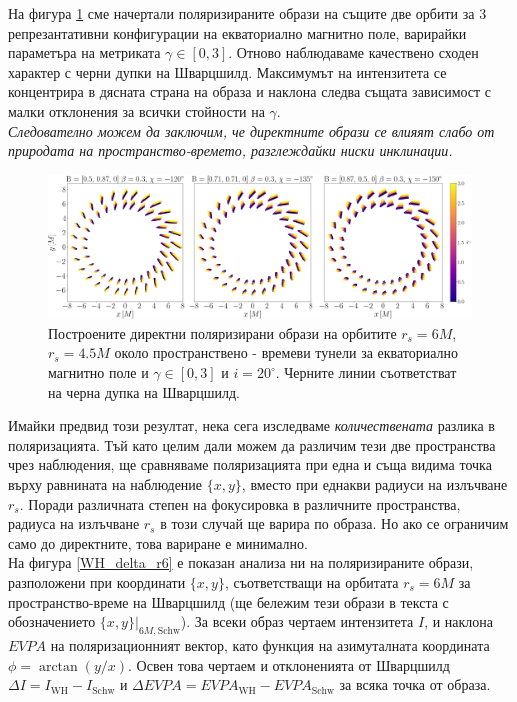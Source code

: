 На фигура \ref{WH_pol_eq_field} сме начертали поляризираните образи на същите две орбити за 3 репрезантативни конфигурации на екваториално магнитно поле, варирайки параметъра на метриката $\gamma \in[0,3]$. Отново наблюдаваме качествено сходен характер с черни дупки на Шварцшилд. Максимумът на интензитета се концентрира в дясната страна на образа и наклона следва същата зависимост с малки отклонения за всички стойности на $\gamma$. \\

\emph{Следователно можем да заключим, че директните образи се влияят слабо от природата на пространство-времето, разглеждайки ниски инклинации.}

\begin{figure}[!htb]
	\centering
	\includegraphics[scale = 0.2]{WH_alpha_Eq_Field.png}
	\caption[Поляризирани директни образи около пространствено - времеви тунели за екваториално магнитно поле.]{\small Построените директни поляризирани образи на орбитите $r_s = 6M$, $r_s = 4.5M$ около пространствено - времеви тунели за екваториално магнитно поле и $\gamma \in[0,3]$ и $i = 20^\circ$. Черните линии съответстват на черна дупка на Шварцшилд.} 
	\label{WH_pol_eq_field}
\end{figure}

\newpage

Имайки предвид този резултат, нека сега изследваме \emph{количествената} разлика в поляризацията. Тъй като целим дали можем да различим тези две пространства чрез наблюдения, ще сравняваме поляризацията при една и съща видима точка върху равнината на наблюдение $\{x,y\}$, вместо при еднакви радиуси на излъчване $r_s$. Поради различната степен на фокусировка в различните пространства, радиуса на излъчване $r_s$ в този случай ще варира по образа. Но ако се ограничим само до директните, това вариране е минимално.\\

На фигура \ref{WH_delta_r6} е показан анализа ни на поляризираните образи, разположени при координати $\{x,y\}$, съответстващи на орбитата $r_s = 6M$ за пространство-време на Шварцшилд (ще бележим тези образи в текста с обозначението $\{x,y\}\vert_{6M, \text{Schw}}$). За всеки образ чертаем интензитета $I$, и наклона $EVPA$ на поляризационният вектор, като функция на азимуталната координата $\phi = \arctan(y / x)$. Освен това чертаем и отклоненията от Шварцшилд $\Delta I = I_{\text{WH}} - I_{\text{Schw}}$ и $\Delta EVPA = EVPA_\text{WH} - EVPA_\text{Schw}$ за всяка точка от образа.

